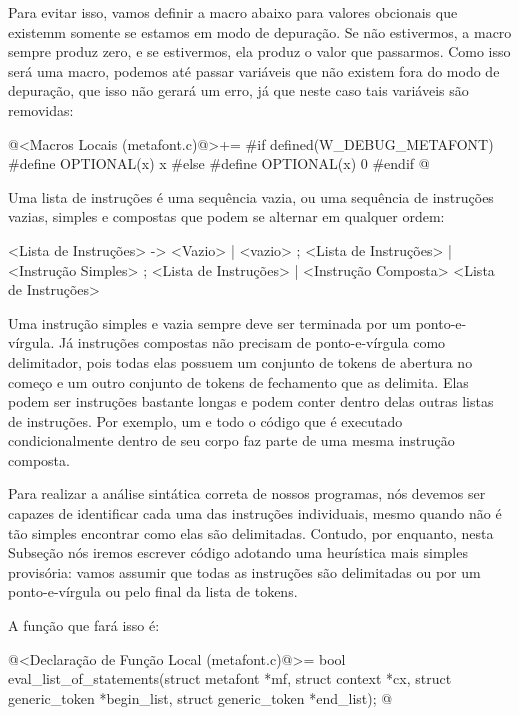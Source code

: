 Para evitar isso, vamos definir a macro abaixo para valores obcionais
que existemm somente se estamos em modo de depuração. Se não
estivermos, a macro sempre produz zero, e se estivermos, ela produz o
valor que passarmos. Como isso será uma macro, podemos até passar
variáveis que não existem fora do modo de depuração, que isso não
gerará um erro, já que neste caso tais variáveis são removidas:

\iniciocodigo
@<Macros Locais (metafont.c)@>+=
#if defined(W_DEBUG_METAFONT)
#define OPTIONAL(x) x
#else
#define OPTIONAL(x) 0
#endif
@
\fimcodigo



Uma lista de instruções é uma sequência vazia, ou uma sequência de
instruções vazias, simples e compostas que podem se alternar em
qualquer ordem:

\alinhaverbatim
<Lista de Instruções> -> <Vazio> |
                         <vazio> ; <Lista de Instruções> |
                         <Instrução Simples> ; <Lista de Instruções> |
                         <Instrução Composta> <Lista de Instruções>
\alinhanormal

Uma instrução simples e vazia sempre deve ser terminada por um
ponto-e-vírgula. Já instruções compostas não precisam de
ponto-e-vírgula como delimitador, pois todas elas possuem um conjunto
de tokens de abertura no começo e um outro conjunto de tokens de
fechamento que as delimita. Elas podem ser instruções bastante longas
e podem conter dentro delas outras listas de instruções. Por exemplo,
um  e todo o código que é executado condicionalmente
dentro de seu corpo faz parte de uma mesma instrução composta.

Para realizar a análise sintática correta de nossos programas, nós
devemos ser capazes de identificar cada uma das instruções
individuais, mesmo quando não é tão simples encontrar como elas são
delimitadas. Contudo, por enquanto, nesta Subseção nós iremos escrever
código adotando uma heurística mais simples provisória: vamos assumir
que todas as instruções são delimitadas ou por um ponto-e-vírgula ou
pelo final da lista de tokens.

A função que fará isso é:

\iniciocodigo
@<Declaração de Função Local (metafont.c)@>=
bool eval_list_of_statements(struct metafont *mf, struct context *cx,
                            struct generic_token *begin_list,
                            struct generic_token *end_list);
@
\fimcodigo

